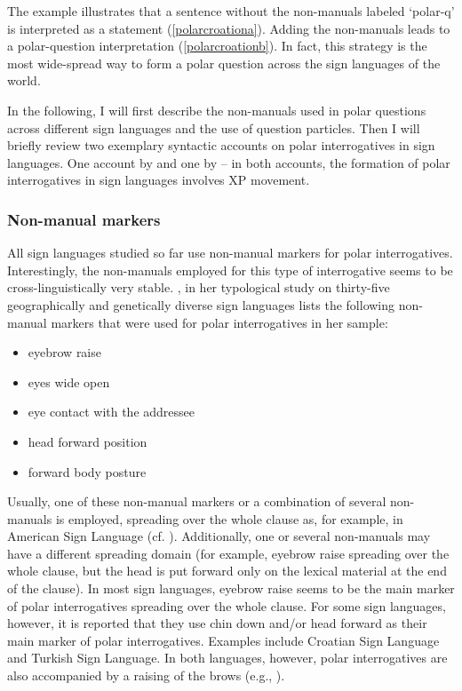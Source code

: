 \noindent The example illustrates that a sentence without the non-manuals labeled `polar-q' is interpreted as a statement (\ref{polarcroationa}). Adding the non-manuals leads to a polar-question interpretation (\ref{polarcroationb}). In fact, this strategy is the most wide-spread way to form a polar question across the sign languages of the world.

In the following, I will first describe the non-manuals used in polar questions across different sign languages and the use of question particles. Then I will briefly review two exemplary syntactic accounts on polar interrogatives in sign languages. One account by \citet{sarac2006interrogative} and one by \citet{aboh2010sa} -- in both accounts, the formation of polar interrogatives in sign languages involves XP movement.

\subsubsection{Non-manual markers}
All\label{nnmpolarintsign} sign languages studied so far use non-manual markers for polar interrogatives. Interestingly, the non-manuals employed for this type of interrogative seems to be cross-linguistically very stable. \citet[19]{zeshan2004interrogative}, in her typological study on thirty-five geographically and genetically diverse sign languages lists the following non-manual markers that were used for polar interrogatives in her sample:

\newpage 
\begin{itemize}[itemsep=0pt]
	\item eyebrow raise
	\item eyes wide open
	\item eye contact with the addressee
	\item head forward position
	\item forward body posture
\end{itemize}

\noindent Usually, one of these non-manual markers or a combination of several non-man\-uals is employed, spreading over the whole clause as, for example, in American Sign Language (cf. \citealt{wilbur1999syntactic}). Additionally, one or several non-manuals may have a different spreading domain (for example, eyebrow raise spreading over the whole clause, but the head is put forward only on the lexical material at the end of the clause). In most sign languages, eyebrow raise seems to be the main marker of polar interrogatives spreading over the whole clause. For some sign languages, however, it is reported that they use chin down and/or head forward as their main marker of polar interrogatives. Examples include Croatian Sign Language and Turkish Sign Language. In both languages, however, polar interrogatives are also accompanied by a raising of the brows (e.g., \citealt{sarac2006interrogative}).

